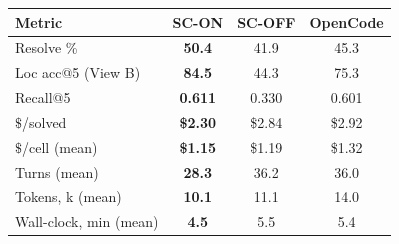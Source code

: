 \begin{tabular}{lccc}
\toprule
Metric & SC-ON & SC-OFF & OpenCode \\
\midrule
Resolve \%                          & \textbf{50.4} & 41.9   & 45.3            \\
Loc acc@5 (View B)                  & \textbf{84.5} & 44.3   & 75.3            \\
Recall@5                            & \textbf{0.611}& 0.330  & 0.601           \\
$\$$/solved                         & \textbf{\$2.30} & \$2.84 & \$2.92        \\
$\$$/cell (mean)                    & \textbf{\$1.15} & \$1.19 & \$1.32        \\
Turns (mean)                        & \textbf{28.3} & 36.2   & 36.0            \\
Tokens, k (mean)                    & \textbf{10.1} & 11.1   & 14.0            \\
Wall-clock, min (mean)              & \textbf{4.5}  & 5.5    & 5.4             \\
\bottomrule
\end{tabular}
